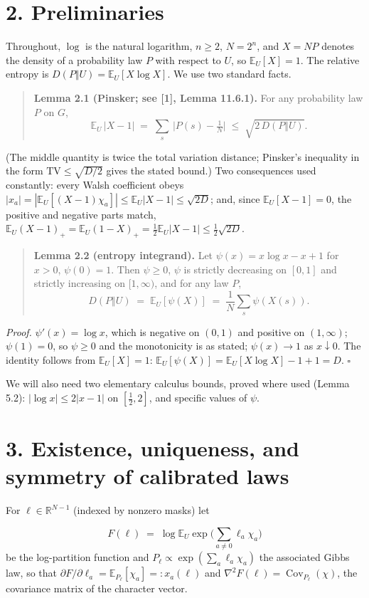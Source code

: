 \documentclass[11pt]{article}
\begin{document}
\section*{2. Preliminaries}
Throughout, $\log$ is the natural logarithm, $n \ge 2$, $N = 2^n$, and $X = NP$ denotes the density of a probability law $P$ with respect to $U$, so $\mathbb{E}_U[X] = 1$.  The relative entropy is $D(P \Vert U) = \mathbb{E}_U[X\log X]$.  We use two standard facts.

\begin{quote}
\textbf{Lemma 2.1 (Pinsker; see [1], Lemma 11.6.1).}  For any probability law $P$ on $G$,
\[
\mathbb{E}_U\,|X - 1| \;=\; \sum_{s}\,\big|P(s) - \tfrac1N\big|
\;\le\; \sqrt{2\,D(P\Vert U)} .
\]
\end{quote}
(The middle quantity is twice the total variation distance; Pinsker's inequality in the form $\mathrm{TV} \le \sqrt{D/2}$ gives the stated bound.)  Two consequences used constantly: every Walsh coefficient obeys $|x_a| = |\mathbb{E}_U[(X-1)\chi_a]| \le \mathbb{E}_U|X-1| \le \sqrt{2D}$; and, since $\mathbb{E}_U[X-1] = 0$, the positive and negative parts match, $\mathbb{E}_U(X-1)_+ = \mathbb{E}_U(1-X)_+ = \tfrac12\mathbb{E}_U|X-1| \le \tfrac12\sqrt{2D}$.

\begin{quote}
\textbf{Lemma 2.2 (entropy integrand).}  Let $\psi(x) = x\log x - x + 1$ for $x > 0$, $\psi(0) = 1$.  Then $\psi \ge 0$, $\psi$ is strictly decreasing on $[0,1]$ and strictly increasing on $[1,\infty)$, and for any law $P$,
\[
D(P \Vert U) \;=\; \mathbb{E}_U[\psi(X)]
\;=\; \frac1N \sum_{s} \psi(X(s)).
\]
\end{quote}
\emph{Proof.}  $\psi'(x) = \log x$, which is negative on $(0,1)$ and positive on $(1,\infty)$; $\psi(1) = 0$, so $\psi \ge 0$ and the monotonicity is as stated; $\psi(x) \to 1$ as $x \downarrow 0$.  The identity follows from $\mathbb{E}_U[X] = 1$: $\mathbb{E}_U[\psi(X)] = \mathbb{E}_U[X\log X] - 1 + 1 = D$.  $\square$

We will also need two elementary calculus bounds, proved where used (Lemma 5.2): $|\log x| \le 2|x-1|$ on $[\tfrac12, 2]$, and specific values of $\psi$.

\section*{3. Existence, uniqueness, and symmetry of calibrated laws}
For $\ell \in \mathbb{R}^{N-1}$ (indexed by nonzero masks) let

\[
F(\ell) \;=\; \log \mathbb{E}_U \exp\Big(\sum_{a\ne0} \ell_a
\chi_a\Big)
\]
be the log-partition function and $P_\ell \propto \exp(\sum_a \ell_a\chi_a)$ the associated Gibbs law, so that $\partial F/\partial \ell_a = \mathbb{E}_{P_\ell}[\chi_a] =: x_a(\ell)$ and $\nabla^2 F(\ell) = \operatorname{Cov}_{P_\ell}(\chi)$, the covariance matrix of the character vector.
\end{document}
